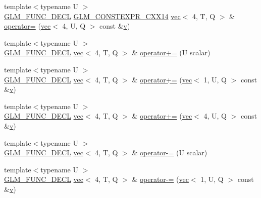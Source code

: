 \begin{DoxyCompactItemize}
\item 
{\footnotesize template$<$typename U $>$ }\\\hyperlink{setup_8hpp_ab2d052de21a70539923e9bcbf6e83a51}{G\+L\+M\+\_\+\+F\+U\+N\+C\+\_\+\+D\+E\+CL} \hyperlink{setup_8hpp_a4dd12abf5e1164bc57f3a34671d03844}{G\+L\+M\+\_\+\+C\+O\+N\+S\+T\+E\+X\+P\+R\+\_\+\+C\+X\+X14} \hyperlink{structglm_1_1vec}{vec}$<$ 4, T, Q $>$ \& \hyperlink{structglm_1_1vec_3_014_00_01_t_00_01_q_01_4_a48ac928cee66a63093353f54d915e223}{operator=} (\hyperlink{structglm_1_1vec}{vec}$<$ 4, U, Q $>$ const \&\hyperlink{_s_d_l__opengl_8h_a10a82eabcb59d2fcd74acee063775f90}{v})
\item 
{\footnotesize template$<$typename U $>$ }\\\hyperlink{setup_8hpp_ab2d052de21a70539923e9bcbf6e83a51}{G\+L\+M\+\_\+\+F\+U\+N\+C\+\_\+\+D\+E\+CL} \hyperlink{structglm_1_1vec}{vec}$<$ 4, T, Q $>$ \& \hyperlink{structglm_1_1vec_3_014_00_01_t_00_01_q_01_4_a51ba1da558471cb6e2bc8f3870b88db5}{operator+=} (U scalar)
\item 
{\footnotesize template$<$typename U $>$ }\\\hyperlink{setup_8hpp_ab2d052de21a70539923e9bcbf6e83a51}{G\+L\+M\+\_\+\+F\+U\+N\+C\+\_\+\+D\+E\+CL} \hyperlink{structglm_1_1vec}{vec}$<$ 4, T, Q $>$ \& \hyperlink{structglm_1_1vec_3_014_00_01_t_00_01_q_01_4_a1f72eb246038606882fc1baf40752008}{operator+=} (\hyperlink{structglm_1_1vec}{vec}$<$ 1, U, Q $>$ const \&\hyperlink{_s_d_l__opengl_8h_a10a82eabcb59d2fcd74acee063775f90}{v})
\item 
{\footnotesize template$<$typename U $>$ }\\\hyperlink{setup_8hpp_ab2d052de21a70539923e9bcbf6e83a51}{G\+L\+M\+\_\+\+F\+U\+N\+C\+\_\+\+D\+E\+CL} \hyperlink{structglm_1_1vec}{vec}$<$ 4, T, Q $>$ \& \hyperlink{structglm_1_1vec_3_014_00_01_t_00_01_q_01_4_a0ecc88837b973bdf129d60381e6e481c}{operator+=} (\hyperlink{structglm_1_1vec}{vec}$<$ 4, U, Q $>$ const \&\hyperlink{_s_d_l__opengl_8h_a10a82eabcb59d2fcd74acee063775f90}{v})
\item 
{\footnotesize template$<$typename U $>$ }\\\hyperlink{setup_8hpp_ab2d052de21a70539923e9bcbf6e83a51}{G\+L\+M\+\_\+\+F\+U\+N\+C\+\_\+\+D\+E\+CL} \hyperlink{structglm_1_1vec}{vec}$<$ 4, T, Q $>$ \& \hyperlink{structglm_1_1vec_3_014_00_01_t_00_01_q_01_4_ad007bb786d8d34db95ee6fd2661cd1b8}{operator-\/=} (U scalar)
\item 
{\footnotesize template$<$typename U $>$ }\\\hyperlink{setup_8hpp_ab2d052de21a70539923e9bcbf6e83a51}{G\+L\+M\+\_\+\+F\+U\+N\+C\+\_\+\+D\+E\+CL} \hyperlink{structglm_1_1vec}{vec}$<$ 4, T, Q $>$ \& \hyperlink{structglm_1_1vec_3_014_00_01_t_00_01_q_01_4_a7cf5d44f1e5c5a5cc24c6d8fc4799b81}{operator-\/=} (\hyperlink{structglm_1_1vec}{vec}$<$ 1, U, Q $>$ const \&\hyperlink{_s_d_l__opengl_8h_a10a82eabcb59d2fcd74acee063775f90}{v})

\end{DoxyCompactItemize}
